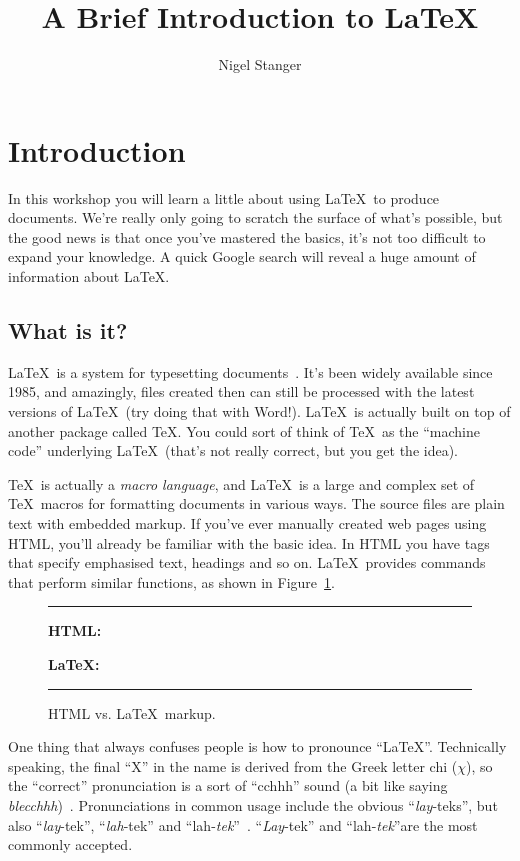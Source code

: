 \documentclass[12pt,a4paper,pdftex]{article}
\title{A Brief Introduction to \LaTeX}
\author{Nigel Stanger}
\begin{document}
\maketitle


\section{Introduction}
\label{sec:intro}

In this workshop you will learn a little about using \LaTeX\ to produce documents. We're really only going to scratch the surface of what's possible, but the good news is that once you've mastered the basics, it's not too difficult to expand your knowledge. A quick Google search will reveal a huge amount of information about \LaTeX.


\subsection{What is it?}
\label{sec:what}

\LaTeX\ is a system for typesetting documents~\cite{UsersGuide}. It's been widely available since 1985, and amazingly, files created then can still be processed with the latest versions of \LaTeX\ (try doing that with Word!). \LaTeX\ is actually built on top of another package called \TeX. You could sort of think of \TeX\ as the ``machine code'' underlying \LaTeX\ (that's not really correct, but you get the idea).

\TeX\ is actually a \emph{macro language}, and \LaTeX\ is a large and complex set of \TeX\ macros for formatting documents in various ways. The source files are plain text with embedded markup. If you've ever manually created web pages using HTML, you'll already be familiar with the basic idea. In HTML you have tags that specify emphasised text, headings and so on. \LaTeX\ provides commands that perform similar functions, as shown in Figure~\ref{fig:HTMLcomparison}.

\begin{figure}
	\hrule\medskip
	\textbf{HTML:}

	\bigskip
	
	\textbf{\LaTeX:}

	\hrule
	\caption{HTML vs. \LaTeX\ markup.}
	\label{fig:HTMLcomparison}
\end{figure}

One thing that always confuses people is how to pronounce ``\LaTeX''. Technically speaking, the final ``X'' in the name is derived from the Greek letter chi ($\chi$), so the ``correct'' pronunciation is a sort of ``cchhh'' sound (a bit like saying \emph{blecchhh})~\cite{TeXBook}. Pronunciations in common usage include the obvious ``\emph{lay}-teks'', but also ``\emph{lay}-tek'', ``\emph{lah}-tek'' and ``lah-\emph{tek}''~\cite{UsersGuide}. ``\emph{Lay}-tek''  and ``lah-\emph{tek}''are the most commonly accepted.
\end{document}
